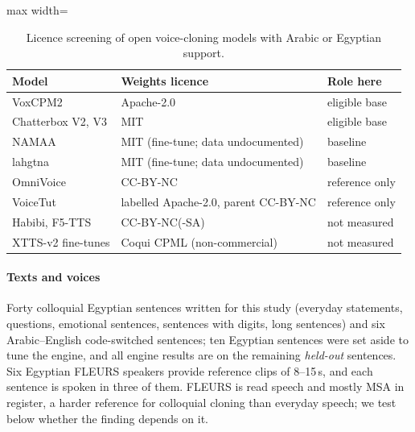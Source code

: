 \documentclass[11pt]{article}
\newcommand{\vox}{VoxCPM2\xspace}
\begin{document}
\begin{table}[t]
\centering\small
\begin{adjustbox}{max width=\linewidth}
\begin{tabular}{@{}lll@{}}
\toprule
Model & Weights licence & Role here \\
\midrule
\vox \citep{zhou2026voxcpm2} & Apache-2.0 & eligible base \\
Chatterbox V2, V3 \citep{resemble2025chatterbox} & MIT & eligible base \\
NAMAA \citep{namaa2026egyptiantts} & MIT (fine-tune; data undocumented) & baseline \\
lahgtna \citep{oddadmix2026lahgtna} & MIT (fine-tune; data undocumented) & baseline \\
OmniVoice \citep{zhu2026omnivoice} & CC-BY-NC & reference only \\
VoiceTut \citep{aly2026voicetut} & labelled Apache-2.0, parent CC-BY-NC & reference only \\
Habibi, F5-TTS \citep{chen2026habibi,chen2025f5tts} & CC-BY-NC(-SA) & not measured \\
XTTS-v2 fine-tunes \citep{casanova2024xtts} & Coqui CPML (non-commercial) & not measured \\
\bottomrule
\end{tabular}
\end{adjustbox}
\caption{Licence screening of open voice-cloning models with Arabic or Egyptian support.}
\label{tab:licences}
\end{table}

\paragraph{Texts and voices}
Forty colloquial Egyptian sentences written for this study (everyday statements, questions, emotional sentences,
sentences with digits, long sentences) and six Arabic--English code-switched sentences; ten Egyptian sentences were set
aside to tune the engine, and all engine results are on the remaining \emph{held-out} sentences. Six Egyptian FLEURS
speakers \citep{conneau2023fleurs} provide reference clips of 8--15\,s, and each sentence is spoken in three of them.
FLEURS is read speech and mostly MSA in register, a harder reference for colloquial cloning than everyday speech; we test
below whether the finding depends on it.
\end{document}
